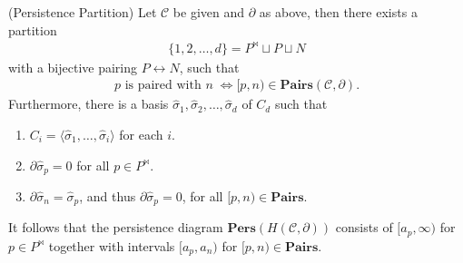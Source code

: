 \begin{theorem}
	{(Persistence Partition) \cite[§2.6]{de2011dualities}} \label{persistence
	partition} Let $\mathcal{C}$ be given and $\partial$ as above, then there
	exists a partition
	\begin{align*}
		\{1,2, \ldots, d\} = P^{\Join} \sqcup P \sqcup N
	\end{align*}
	with a bijective pairing $P \leftrightarrow N$, such that
	\begin{align}
		p \text{ is paired with }n \; \iff [p,n) \in \textbf{Pairs}(\mathcal{C}, \partial).
	\end{align}
	Furthermore, there is a basis
	$\hat{\sigma}_{1}, \hat{\sigma}_{2}, \ldots, \hat{\sigma}_{d}$ of $C_{d}$ such
	that
	\begin{enumerate}
		\item $C_{i} = \langle \hat{\sigma}_{1}, \ldots, \hat{\sigma}_{i} \rangle$ for
			each $i$.

		\item $\partial\hat{\sigma}_{p} = 0$ for all $p \in P^{\Join}$.

		\item $\partial\hat{\sigma}_{n} = \hat{\sigma}_{p}$, and thus
			$\partial\hat{\sigma}_{p} = 0$, for all $[p,n) \in \textbf{Pairs}$.
	\end{enumerate}
	It follows that the persistence diagram
	$\textbf{Pers}(H(\mathcal{C},\partial))$ consists of $[a_{p}, \infty)$ for
	$p \in P^{\Join}$ together with intervals $[a_{p},a_{n})$ for
	$[p,n) \in \textbf{Pairs}$.
\end{theorem}

